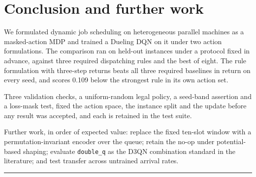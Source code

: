 \section{Conclusion and further work}\label{conclusion-and-further-work}

We formulated dynamic job scheduling on heterogeneous parallel machines as a masked-action MDP and
trained a Dueling DQN on it under two action formulations. The comparison ran on held-out instances
under a protocol fixed in advance, against three required dispatching rules and the best of eight.
The rule formulation with three-step returns beats all three required baselines in return on
every seed, and scores 0.109 below the strongest rule in its own action set.

Three validation checks, a uniform-random legal policy, a seed-band assertion and a loss-mask
test, fixed the action space, the instance split and the update before any result was accepted,
and each is retained in the test suite.

Further work, in order of expected value: replace the fixed ten-slot window with a
permutation-invariant encoder over the queue; retain the no-op under potential-based shaping;
evaluate \texttt{double\_q} as the D3QN combination standard in the literature; and test transfer across
untrained arrival rates.

\begin{center}\rule{0.5\linewidth}{0.5pt}\end{center}
